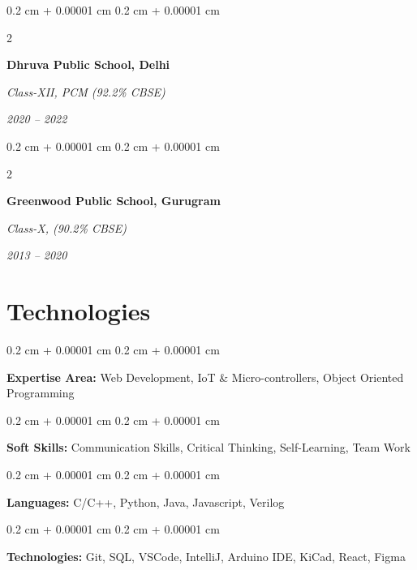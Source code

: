 \documentclass[10pt, letterpaper]{article}
\newenvironment{onecolentry}{
    \begin{adjustwidth}{
        0.2 cm + 0.00001 cm
    }{
        0.2 cm + 0.00001 cm
    }
}{
    \end{adjustwidth}
} %
\newenvironment{twocolentry}[2][]{
    \onecolentry
    \def\secondColumn{#2}
    \setcolumnwidth{\fill, 4.5 cm}
    \begin{paracol}{2}
}{
    \switchcolumn \raggedleft \secondColumn
    \end{paracol}
    \endonecolentry
} %
\begin{document}
        \vspace{0.2 cm}

        \begin{twocolentry}{


            
        \textit{2020 – 2022}}
            \textbf{Dhruva Public School, Delhi}

            \textit{Class-XII, PCM (92.2\% CBSE)}
        \end{twocolentry}

        \vspace{0.2 cm}

        \begin{twocolentry}{


            
        \textit{2013 – 2020}}
            \textbf{Greenwood Public School, Gurugram}

            \textit{Class-X, (90.2\% CBSE)}
        \end{twocolentry}

        \vspace{0.10 cm}
        

    \section{Technologies}

        \begin{onecolentry}
            \textbf{Expertise Area:} Web Development, IoT \& Micro-controllers, Object Oriented Programming
        \end{onecolentry}

        \vspace{0.2 cm}

        \begin{onecolentry}
            \textbf{Soft Skills:} Communication Skills, Critical Thinking, Self-Learning, Team Work
        \end{onecolentry}

        \vspace{0.2 cm}
        \begin{onecolentry}
            \textbf{Languages:} C/C++, Python, Java, Javascript, Verilog
        \end{onecolentry}

        \vspace{0.2 cm}

        \begin{onecolentry}
            \textbf{Technologies:} Git, SQL, VSCode, IntelliJ, Arduino IDE, KiCad, React, Figma 
        \end{onecolentry}
\end{document}
